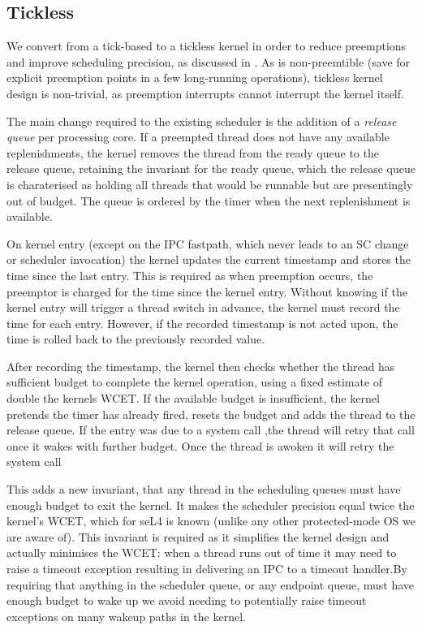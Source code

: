 \subsection{Tickless}

We convert \selfour from a tick-based to a tickless kernel in order to reduce preemptions and
improve scheduling precision, as discussed in .
As \selfour is non-preemtible (save for explicit preemption points in a few long-running
operations), tickless kernel design is non-trivial, as preemption interrupts cannot interrupt the
kernel itself.

The main change required to the existing scheduler is the addition of a \emph{release queue} per
processing core. If a
preempted thread does not have any available replenishments, the kernel removes the thread from the
ready queue to the release queue, retaining the invariant for the ready queue, which the release
queue is charaterised as holding all threads that would be runnable but are presentingly out of
budget. The queue is ordered by the timer when the next replenishment is available.

On kernel entry (except on the IPC fastpath, which never leads to an SC
change or scheduler invocation) the kernel updates the current
timestamp and stores the time since the last entry. This is required as when preemption occurs, the
preemptor is charged for the time since the kernel entry. Without knowing if the kernel entry will
trigger a thread switch in advance, the kernel must record the time for each entry. However, if the
recorded timestamp is not acted upon, the time is rolled back to the previously recorded value.

After recording the timestamp, the kernel then checks
whether the thread has sufficient budget to complete the kernel
operation, using a fixed estimate of double the kernels \gls{WCET}.
If the available budget is insufficient, the kernel pretends the timer has already fired,
resets the budget and adds the thread to the release queue. If the entry was due to a system call
,the thread will retry that call once it wakes with further budget.
Once the thread is awoken it will retry the system call

This adds a new
invariant, that any thread in the scheduling queues must have enough budget to exit the kernel.
It makes the scheduler precision equal twice the kernel's WCET, which for
seL4 is known (unlike any other protected-mode OS we are aware of).
This invariant is required as it simplifies the kernel design and actually minimises the WCET: when
a
thread runs out of time it may need to raise a timeout exception resulting in delivering an IPC to a
timeout handler.By requiring that anything in the scheduler queue, or any endpoint queue, must have
enough budget to wake up we avoid needing to potentially raise timeout exceptions on many wakeup
paths in the kernel.

